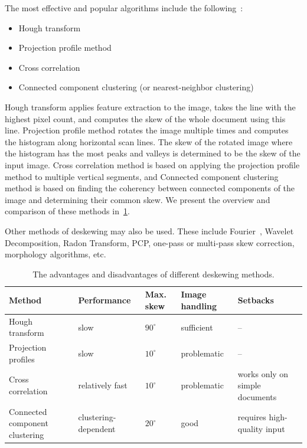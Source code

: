 The most effective and popular algorithms include the following~\citep{skewBestTechniques}:
\begin{itemize}
    \item Hough transform~\cite{houghTransform}
    \item Projection profile method~\cite{skewAngleDetection}
    \item Cross correlation~\cite{skewAngleDetection}
    \item Connected component clustering (or nearest-neighbor clustering)~\citep{skewClustering}
\end{itemize}

Hough transform applies feature extraction to the image, takes the line with the highest pixel count, and computes the skew of the whole document using this line. Projection profile method rotates the image multiple times and computes the histogram along horizontal scan lines. The skew of the rotated image where the histogram has the most peaks and valleys is determined to be the skew of the input image. Cross correlation method is based on applying the projection profile method to multiple vertical segments, and Connected component clustering method is based on finding the coherency between connected components of the image and determining their common skew. We present the overview and comparison of these methods in~\cref{tab:preprocessSkewProsCons}.

Other methods of deskewing may also be used. These include Fourier~\citep{fourierTransform}, Wavelet Decomposition, Radon Transform, PCP, one-pass or multi-pass skew correction, morphology algorithms, etc.

\begin{table}[t]
\renewcommand{\arraystretch}{1.5}
{\footnotesize
\begin{tabular}{p{8em}p{7em}p{2.5em}p{6em}p{9em}}
\toprule
\textbf{Method} & \textbf{Performance} & \textbf{Max. skew} & \textbf{Image handling} & \textbf{Setbacks} \\
\midrule
Hough transform
&
slow
&
$90^{\circ}$
&
sufficient
&
--
\\
Projection profiles
&
slow
&
$10^{\circ}$
&
problematic
&
--
\\
Cross correlation
&
relatively fast
&
$10^{\circ}$
&
problematic
&
works only on simple documents
\\
Connected component clustering
&
clustering-dependent
&
$20^{\circ}$
&
good
&
requires high-quality input
\\
\bottomrule
\end{tabular}
}
\caption{The advantages and disadvantages of different deskewing methods.}
\label{tab:preprocessSkewProsCons}
\end{table}

